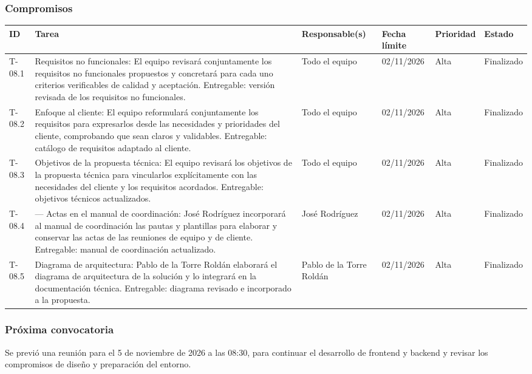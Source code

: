 \subsubsection{Compromisos}
\begin{center}\footnotesize
\begin{tabularx}{\textwidth}{@{}p{}p{} p{}p{}p{}p{}@{}}
\toprule
\rowcolor{tableHeader} ID & Tarea & Responsable(s) & Fecha límite & Prioridad & Estado \\
\midrule
T-08.1 & Requisitos no funcionales: El equipo revisará conjuntamente los requisitos no funcionales propuestos y concretará para cada uno criterios verificables de calidad y aceptación. Entregable: versión revisada de los requisitos no funcionales. & Todo el equipo & 02/11/2026 & Alta & Finalizado \\
T-08.2 & Enfoque al cliente: El equipo reformulará conjuntamente los requisitos para expresarlos desde las necesidades y prioridades del cliente, comprobando que sean claros y validables. Entregable: catálogo de requisitos adaptado al cliente. & Todo el equipo & 02/11/2026 & Alta & Finalizado \\
T-08.3 & Objetivos de la propuesta técnica: El equipo revisará los objetivos de la propuesta técnica para vincularlos explícitamente con las necesidades del cliente y los requisitos acordados. Entregable: objetivos técnicos actualizados. & Todo el equipo & 02/11/2026 & Alta & Finalizado \\
T-08.4 &— Actas en el manual de coordinación: José Rodríguez incorporará al manual de coordinación las pautas y plantillas para elaborar y conservar las actas de las reuniones de equipo y de cliente. Entregable: manual de coordinación actualizado. & José Rodríguez & 02/11/2026 & Alta & Finalizado \\
T-08.5 & Diagrama de arquitectura: Pablo de la Torre Roldán elaborará el diagrama de arquitectura de la solución y lo integrará en la documentación técnica. Entregable: diagrama revisado e incorporado a la propuesta. & Pablo de la Torre Roldán & 02/11/2026 & Alta & Finalizado \\
\bottomrule
\end{tabularx}
\end{center}

\subsubsection{Próxima convocatoria}
Se previó una reunión para el 5 de noviembre de 2026 a las 08:30, para continuar el desarrollo de frontend y backend y revisar los compromisos de diseño y preparación del entorno.